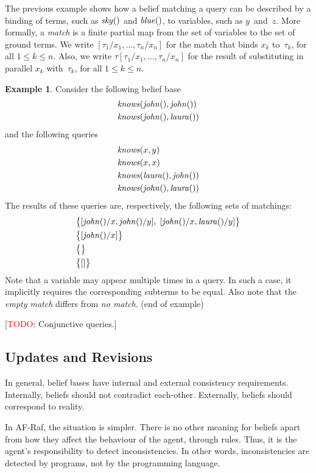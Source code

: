 \documentclass[a4paper,12pt,oneside,fleqn]{book} %
\theoremstyle{plain}
\theoremstyle{definition}
\newtheorem{example}{Example}
\theoremstyle{remark}
\newcommand{\eox}[1]{\hskip5mm\null\nobreak\hfill#1}
\newcommand{\eoe}{\eox{(end of example)}}
\newcommand{\todo}[1]{[\textcolor{red}{TODO}: #1]}
\begin{document}
The previous example shows how a belief matching a query can be described
by a binding of terms, such as ${\it sky}()$ and ${\it blue}()$, to
variables, such as $y$~and~$z$.  More formally, a \emph{match} is a finite
partial map from the set of variables to the set of ground terms.  We write
$[\tau_1/x_1,\ldots,\tau_n/x_n]$ for the match that binds $x_k$
to~$\tau_k$, for all $1\le k\le n$.  Also, we write
$\tau[\tau_1/x_1,\ldots,\tau_n/x_n]$ for the result of substituting in
parallel $x_k$ with~$\tau_k$, for all $1\le k\le n$.

\begin{example} Consider the following belief base \begin{align} &{\it
knows}({\it john}(), {\it john}()) \\ &{\it knows}({\it john}(), {\it
laura}()) \end{align} and the following queries \begin{align} &{\it
knows}(x, y) \\ &{\it knows}(x, x) \\ &{\it knows}({\it laura}(), {\it
john}()) \\ &{\it knows}({\it john}(), {\it laura}()) \end{align} The
results of these queries are, respectively, the following sets of
matchings: \begin{align} &\bigl\{ [{\it john}()/x, {\it john}()/y],\; [{\it
john}()/x,{\it laura}()/y] \bigr\} \\ &\bigl\{ [{\it john}()/x] \bigr\} \\
&\bigl\{\bigr\} \\ &\bigl\{[]\bigr\} \end{align} Note that a variable may
appear multiple times in a query.  In such a case, it implicitly requires
the corresponding subterms to be equal.  Also note that the \emph{empty
match} differs from \emph{no match}.  \eoe \end{example}

\todo{Conjunctive queries.}

\subsection{Updates and Revisions}

In general, belief bases have internal and external consistency
requirements.  Internally, beliefs should not contradict each-other.
Externally, beliefs should correspond to reality.

In AF-Raf, the situation is simpler.  There is no other meaning for beliefs
apart from how they affect the behaviour of the agent, through rules.
Thus, it is the agent's responsibility to detect inconsistencies.  In other
words, inconsistencies are detected by programs, not by the programming
language.
\end{document}
